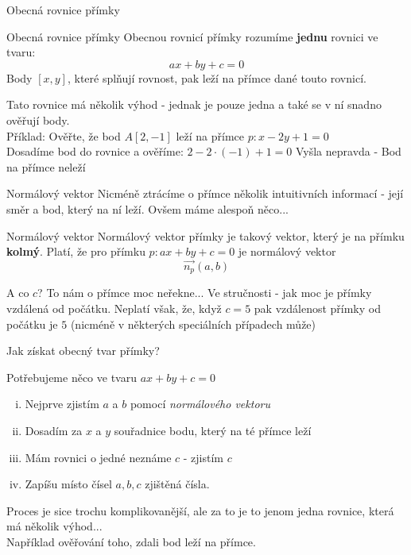 \documentclass[aspectratio=169]{beamer} %
\begin{document}
	 \begin{frame}{Obecná rovnice přímky}
	 	\begin{alertblock}{Obecná rovnice přímky}
	 			Obecnou rovnicí přímky rozumíme \textbf{jednu} rovnici ve tvaru: $$ax+by+c=0$$ Body $[x,y]$, které splňují rovnost, pak leží na přímce dané touto rovnicí.
	 	\end{alertblock}
	 	Tato rovnice má několik výhod - jednak je pouze jedna a také se v ní snadno ověřují body. \\
	 	Příklad: Ověřte, že bod $A[2,-1]$ leží na přímce $p: x-2y+1=0$ \\[2ex]
	 	Dosadíme bod do rovnice a ověříme: $2-2\cdot (-1)+1 = 0$ Vyšla nepravda - Bod na přímce neleží
	 \end{frame}
	 
	 \begin{frame}{Normálový vektor}
	 	Nicméně ztrácíme o přímce několik intuitivních informací - její směr a bod, který na ní leží. Ovšem máme alespoň něco...
	 	\begin{alertblock}{Normálový vektor}
	 	Normálový vektor přímky je takový vektor, který je na přímku \textbf{kolmý}. Platí, že pro přímku $p: ax+by+c=0$ je normálový vektor $$\vec{n_p}(a,b)$$
	 	\end{alertblock}
	 	A co $c$? To nám o přímce moc neřekne... Ve stručnosti - jak moc je přímky vzdálená od počátku. Neplatí však, že, když $c=5$ pak vzdálenost přímky od počátku je $5$ (nicméně v některých speciálních případech může)
	 \end{frame}
	 
	 \begin{frame}{Jak získat obecný tvar přímky?}
	  \begin{center} Potřebujeme něco ve tvaru $ax+by+c=0$ \end{center} 
	 	\begin{enumerate}[i) ]
	 	 \item Nejprve zjistím $a$ a $b$ pomocí \textit{normálového vektoru}
	 	 \item Dosadím za $x$ a $y$ souřadnice bodu, který na té přímce leží
	 	 \item Mám rovnici o jedné neznáme $c$ - zjistím $c$
	 	 \item Zapíšu místo čísel $a,b,c$ zjištěná čísla. 
	 	\end{enumerate}
	  Proces je sice trochu komplikovanější, ale za to je to jenom jedna rovnice, která má několik výhod... \\[2ex]
	  Například ověřování toho, zdali bod leží na přímce.
	 \end{frame}
	 
\end{document}
